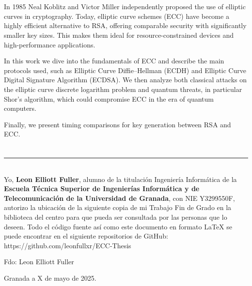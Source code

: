 \\

\vspace{0.7cm}
\\
In 1985 Neal Koblitz and Victor Miller independently proposed the use of elliptic curves in cryptography. Today, elliptic curve schemes (ECC) have become a highly efficient alternative to RSA, offering comparable security with significantly smaller key sizes. This makes them ideal for resource-constrained devices and high-performance applications.

In this work we dive into the fundamentals of ECC and describe the main protocols used, such as Elliptic Curve Diffie–Hellman (ECDH) and Elliptic Curve Digital Signature Algorithm (ECDSA). We then analyze both classical attacks on the elliptic curve discrete logarithm problem and quantum threats, in particular Shor’s algorithm, which could compromise ECC in the era of quantum computers.

Finally, we present timing comparisons for key generation between RSA and ECC.

\chapter*{}
\thispagestyle{empty}

\noindent\rule[-1ex]{\textwidth}{2pt}\\[4.5ex]

Yo, \textbf{Leon Elliott Fuller}, alumno de la titulación Ingeniería Informática de la \textbf{Escuela Técnica Superior
de Ingenierías Informática y de Telecomunicación de la Universidad de Granada}, con NIE Y3299550F, autorizo la ubicación de la siguiente copia de mi Trabajo Fin de Grado en la biblioteca del centro para que pueda ser consultada por las personas que lo deseen. Todo el código fuente así como este documento en formato LaTeX se puede encontrar en el siguiente repositorios de GitHub: https://github.com/leonfullxr/ECC-Thesis

\vspace{6cm}

\noindent Fdo: Leon Elliott Fuller

\vspace{2cm}

\begin{flushright}
Granada a X de mayo de 2025.
\end{flushright}


